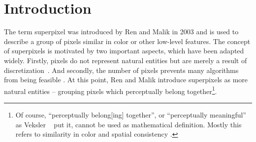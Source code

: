 \chapter{Introduction}
\label{chapter:introduction}

The term superpixel was introduced by Ren and Malik in 2003 \cite{RenMalik:2003} and is used to describe a group of pixels similar in color or other low-level features. The concept of superpixels is motivated by two important aspects, which have been adapted widely. Firstly, pixels do not represent natural entities but are merely a result of discretization~\cite{RenMalik:2003}. And secondly, the number of pixels prevents many algorithms from being feasible \cite{RenMalik:2003}. At this point, Ren and Malik introduce superpixels as more natural entities -- grouping pixels which perceptually belong together\footnote{Of course, ``perceptually belong[ing] together'', or ``perceptually meaningful'' as Veksler \etal~\cite{VekslerBoykovMehrani:2010} put it, cannot be used as mathematical definition. Mostly this refers to similarity in color and spatial consistency \cite{VekslerBoykovMehrani:2010}.}.

